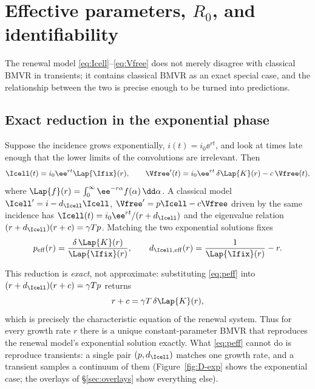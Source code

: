 
\section{Effective parameters, $R_0$, and identifiability}
\label{sec:peff-section}

The renewal model \eqref{eq:Icell}--\eqref{eq:Vfree} does not merely
disagree with classical BMVR in transients; it contains classical BMVR as an
exact special case, and the relationship between the two is precise enough
to be turned into predictions.

\subsection{Exact reduction in the exponential phase}

Suppose the incidence grows exponentially, $i(t)=i_0\ee^{rt}$, and look at
times late enough that the lower limits of the convolutions are irrelevant.
Then
\begin{equation}
\Icell(t)=i_0\ee^{rt}\Lap{\Ifix}(r),
\qquad
\Vfree'(t)=i_0\ee^{rt}\,\delta\Lap{K}(r)-c\,\Vfree(t),
\end{equation}
where $\Lap{f}(r)=\int_0^\infty\ee^{-r\alpha}f(\alpha)\,\dd\alpha$. A
classical model $\Icell'=i-d_{\Icell}\Icell$, $\Vfree'=p\Icell-c\Vfree$
driven by the same incidence has $\Icell(t)=i_0\ee^{rt}/(r+d_{\Icell})$ and
the eigenvalue relation $(r+d_{\Icell})(r+c)=\gamma Tp$. Matching the two
exponential solutions fixes
\begin{equation}
p_{\rm eff}(r)=\frac{\delta\,\Lap{K}(r)}{\Lap{\Ifix}(r)},
\qquad
d_{\Icell,{\rm eff}}(r)=\frac{1}{\Lap{\Ifix}(r)}-r.
\label{eq:peff}
\end{equation}

This reduction is \emph{exact}, not approximate: substituting
\eqref{eq:peff} into $(r+d_{\Icell})(r+c)=\gamma Tp$ returns
\begin{equation}
r+c=\gamma T\,\delta\Lap{K}(r),
\label{eq:char}
\end{equation}
which is precisely the characteristic equation of the renewal system. Thus
for every growth rate $r$ there is a unique constant-parameter BMVR that
reproduces the renewal model's exponential solution exactly. What
\eqref{eq:peff} cannot do is reproduce transients: a single pair
$(p,d_{\Icell})$ matches one growth rate, and a transient samples a
continuum of them (Figure~\ref{fig:D-exp} shows the exponential case; the
overlays of \S\ref{sec:overlays} show everything else).

